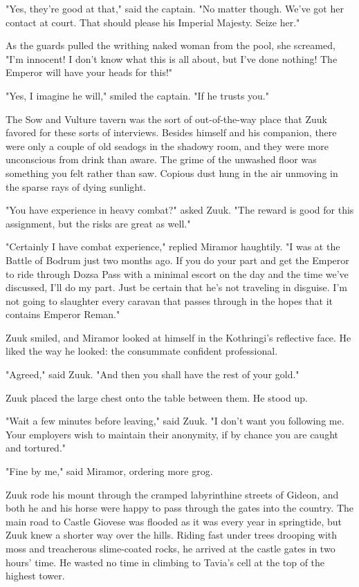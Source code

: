 "Yes, they're good at that," said the captain. "No matter though. We've got her contact at court. That should please his Imperial Majesty. Seize her."

As the guards pulled the writhing naked woman from the pool, she screamed, "I'm innocent! I don't know what this is all about, but I've done nothing! The Emperor will have your heads for this!"

"Yes, I imagine he will," smiled the captain. "If he trusts you."

The Sow and Vulture tavern was the sort of out-of-the-way place that Zuuk favored for these sorts of interviews. Besides himself and his companion, there were only a couple of old seadogs in the shadowy room, and they were more unconscious from drink than aware. The grime of the unwashed floor was something you felt rather than saw. Copious dust hung in the air unmoving in the sparse rays of dying sunlight.

"You have experience in heavy combat?" asked Zuuk. "The reward is good for this assignment, but the risks are great as well."

"Certainly I have combat experience," replied Miramor haughtily. "I was at the Battle of Bodrum just two months ago. If you do your part and get the Emperor to ride through Dozsa Pass with a minimal escort on the day and the time we've discussed, I'll do my part. Just be certain that he's not traveling in disguise. I'm not going to slaughter every caravan that passes through in the hopes that it contains Emperor Reman."

Zuuk smiled, and Miramor looked at himself in the Kothringi's reflective face. He liked the way he looked: the consummate confident professional.

"Agreed," said Zuuk. "And then you shall have the rest of your gold."

Zuuk placed the large chest onto the table between them. He stood up.

"Wait a few minutes before leaving," said Zuuk. "I don't want you following me. Your employers wish to maintain their anonymity, if by chance you are caught and tortured."

"Fine by me," said Miramor, ordering more grog.

Zuuk rode his mount through the cramped labyrinthine streets of Gideon, and both he and his horse were happy to pass through the gates into the country. The main road to Castle Giovese was flooded as it was every year in springtide, but Zuuk knew a shorter way over the hills. Riding fast under trees drooping with moss and treacherous slime-coated rocks, he arrived at the castle gates in two hours' time. He wasted no time in climbing to Tavia's cell at the top of the highest tower.

